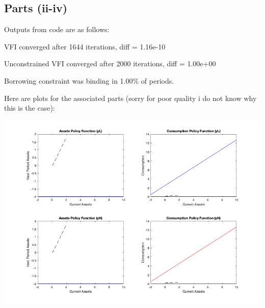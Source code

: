 \documentclass[10pt,a4paper]{article}
\begin{document}
  \subsection*{Parts (ii-iv)}

  Outputs from code are as follows:

  VFI converged after 1644 iterations, diff = 1.16e-10

  Unconstrained VFI converged after 2000 iterations, diff = 1.00e+00

  Borrowing constraint was binding in 1.00\% of periods.

  Here are plots for the associated parts (sorry for poor quality i do not know why this is the case):

  \begin{centering}
  \includegraphics*[width=18cm]{VFI.png}


\end{centering}
\end{document}
